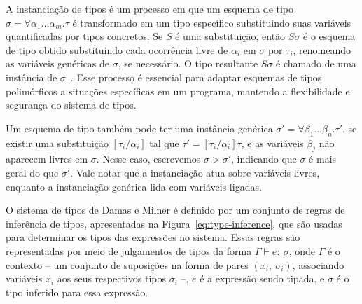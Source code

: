 A instanciação de tipos é um processo em que um esquema de tipo $\sigma = \forall \alpha_1 \ldots \alpha_m. \tau$ é transformado em um tipo específico substituindo suas variáveis quantificadas por tipos concretos.
Se $S$ é uma substituição, então $S\sigma$ é o esquema de tipo obtido substituindo cada ocorrência livre de $\alpha_i$ em $\sigma$ por $\tau_i$, renomeando as variáveis genéricas de $\sigma$, se necessário.
O tipo resultante $S\sigma$ é chamado de uma instância de $\sigma$~\cite{damas1982principal}.
Esse processo é essencial para adaptar esquemas de tipos polimórficos a situações específicas em um programa, mantendo a flexibilidade e segurança do sistema de tipos.

Um esquema de tipo também pode ter uma instância genérica $\sigma' = \forall \beta_1 \ldots \beta_n. \tau'$, se existir uma substituição $[ \tau_i / \alpha_i ]$ tal que $\tau' = [\tau_i / \alpha_i]\tau$, e as variáveis $\beta_j$ não aparecem livres em $\sigma$.
Nesse caso, escrevemos $\sigma > \sigma'$, indicando que $\sigma$ é mais geral do que $\sigma'$.
Vale notar que a instanciação atua sobre variáveis livres, enquanto a instanciação genérica lida com variáveis ligadas.

O sistema de tipos de Damas e Milner é definido por um conjunto de regras de inferência de tipos, apresentadas na Figura~\ref{eq:type-inference}, que são usadas para determinar os tipos das expressões no sistema.
Essas regras são representadas por meio de julgamentos de tipos da forma $\Gamma \vdash e{:}\ \sigma$, onde $\Gamma$ é o contexto -- um conjunto de suposições na forma de pares $(x_i,\ \sigma_i)$, associando variáveis $x_i$ aos seus respectivos tipos $\sigma_i$ --, $e$ é a expressão sendo tipada, e $\sigma$ é o tipo inferido para essa expressão.

